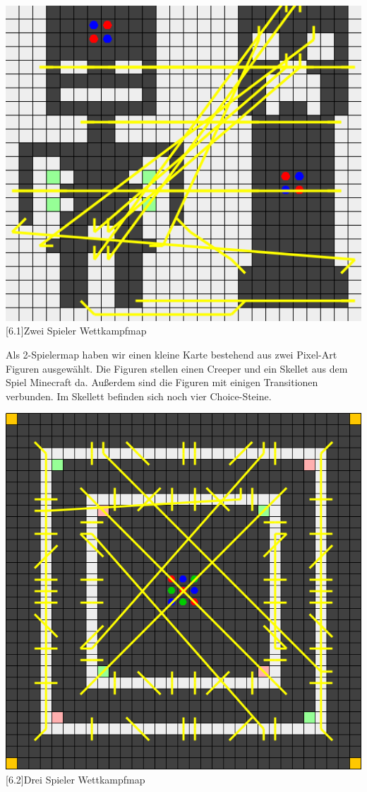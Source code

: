 \documentclass[12pt,a4paper,bibliography=totocnumbered,listof=totocnumbered]{scrartcl}
\begin{document}
	
	\vspace{1em}
	\begin{minipage}{\linewidth}
		\centering
		\includegraphics[width=0.66\linewidth]{pics/Kapitel_6/CreeperMap.png}
		[6.1]{Zwei Spieler Wettkampfmap}
		\label{fig:6.1}
	\end{minipage}
	\vspace{1em}
	
	Als 2-Spielermap haben wir einen kleine Karte bestehend aus zwei Pixel-Art Figuren ausgewählt. Die Figuren stellen einen Creeper und ein Skellet aus dem Spiel Minecraft da. Außerdem sind die Figuren mit einigen Transitionen verbunden. Im Skellett befinden sich noch vier Choice-Steine.
	
	\vspace{1em}
	\begin{minipage}{\linewidth}
		\centering
		\includegraphics[width=0.66\linewidth]{pics/Kapitel_6/DreiSpielerKreise.png}
		[6.2]{Drei Spieler Wettkampfmap}
		\label{fig:6.2}
	\end{minipage}
	\vspace{1em}
	
\end{document}
